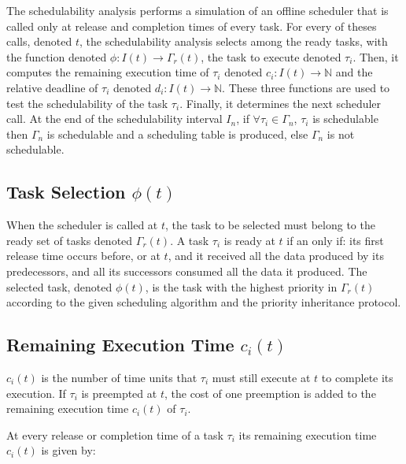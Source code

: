 \documentclass[conference,compsocconf]{IEEEtran}
\begin{document}
The schedulability analysis performs a simulation of an offline scheduler that
is called only at release and completion times of every task. For every of
theses calls, denoted $t$, the schedulability analysis selects among the ready
tasks, with the function denoted $\phi:I(t) \to \Gamma_r(t) $, the task to
execute denoted $\tau_i$. Then, it computes the remaining execution time of
$\tau_i$ denoted $c_i:I(t) \to \mathbb{N}$ and the relative deadline of
$\tau_i$ denoted $d_i:I(t) \to \mathbb{N}$. These three functions are used to
test the schedulability of the task $\tau_i$. Finally, it determines the next
scheduler call. At the end of the schedulability interval $I_n$, if $\forall
\tau_i \in \Gamma_n$, $\tau_i$ is schedulable then $\Gamma_n$ is schedulable
and a scheduling table is produced, else $\Gamma_n$ is not schedulable.

\subsection{Task Selection $\phi(t)$}

When the scheduler is called at $t$, the task to be selected must belong to the
ready set of tasks denoted $\Gamma_r(t)$. A task $\tau_i$ is ready at $t$ if an
only if: its first release time occurs before, or at $t$, and it received all
the data produced by its predecessors, and all its successors consumed all the
data it produced. The selected task, denoted $\phi(t)$, is the task with the
highest priority in $\Gamma_r(t)$ according to the given scheduling algorithm
and the priority inheritance protocol.

\subsection{Remaining Execution Time $c_i(t)$}
\label{remExecTime}
$c_i(t)$ is the number of time units that $\tau_i$ must still execute at $t$ to
complete its execution. If $\tau_i$ is preempted at $t$, the cost of one
preemption is added to the remaining execution time $c_i(t)$ of $\tau_i$.

At every release or completion time of a task $\tau_i$ its remaining execution
time $c_i(t)$ is given by:
\end{document}
